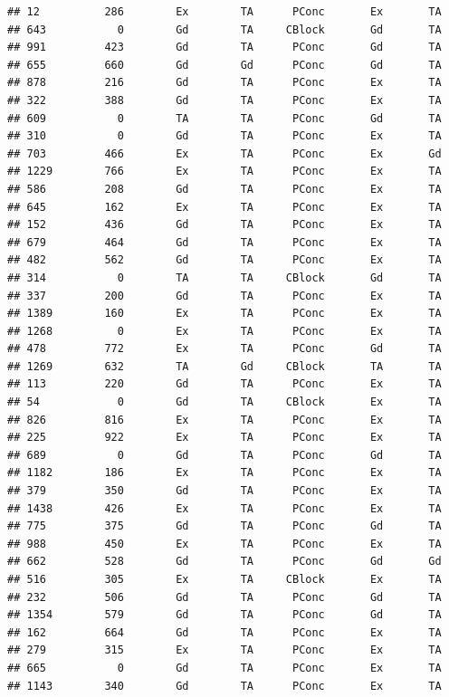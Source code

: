 \documentclass[]{article}
\begin{document}
\begin{verbatim}
## 12          286        Ex        TA      PConc       Ex       TA
## 643           0        Gd        TA     CBlock       Gd       TA
## 991         423        Gd        TA      PConc       Gd       TA
## 655         660        Gd        Gd      PConc       Gd       TA
## 878         216        Gd        TA      PConc       Ex       TA
## 322         388        Gd        TA      PConc       Ex       TA
## 609           0        TA        TA      PConc       Gd       TA
## 310           0        Gd        TA      PConc       Ex       TA
## 703         466        Ex        TA      PConc       Ex       Gd
## 1229        766        Ex        TA      PConc       Ex       TA
## 586         208        Gd        TA      PConc       Ex       TA
## 645         162        Ex        TA      PConc       Ex       TA
## 152         436        Gd        TA      PConc       Ex       TA
## 679         464        Gd        TA      PConc       Ex       TA
## 482         562        Gd        TA      PConc       Ex       TA
## 314           0        TA        TA     CBlock       Gd       TA
## 337         200        Gd        TA      PConc       Ex       TA
## 1389        160        Ex        TA      PConc       Ex       TA
## 1268          0        Ex        TA      PConc       Ex       TA
## 478         772        Ex        TA      PConc       Gd       TA
## 1269        632        TA        Gd     CBlock       TA       TA
## 113         220        Gd        TA      PConc       Ex       TA
## 54            0        Gd        TA     CBlock       Ex       TA
## 826         816        Ex        TA      PConc       Ex       TA
## 225         922        Ex        TA      PConc       Ex       TA
## 689           0        Gd        TA      PConc       Gd       TA
## 1182        186        Ex        TA      PConc       Ex       TA
## 379         350        Gd        TA      PConc       Ex       TA
## 1438        426        Ex        TA      PConc       Ex       TA
## 775         375        Gd        TA      PConc       Gd       TA
## 988         450        Ex        TA      PConc       Ex       TA
## 662         528        Gd        TA      PConc       Gd       Gd
## 516         305        Ex        TA     CBlock       Ex       TA
## 232         506        Gd        TA      PConc       Gd       TA
## 1354        579        Gd        TA      PConc       Gd       TA
## 162         664        Gd        TA      PConc       Ex       TA
## 279         315        Ex        TA      PConc       Ex       TA
## 665           0        Gd        TA      PConc       Ex       TA
## 1143        340        Gd        TA      PConc       Ex       TA

\end{verbatim}
\end{document}
